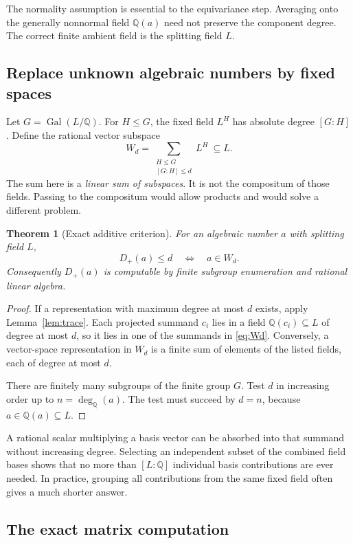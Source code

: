 \documentclass[11pt,a4paper]{article}
\newtheorem{theorem}{Theorem}[section]
\theoremstyle{definition}\newtheorem{definition}[theorem]{Definition}
\theoremstyle{remark}\newtheorem{remark}[theorem]{Remark}
\newcommand{\Q}{\mathbb Q}
\newcommand{\Gal}{\operatorname{Gal}}
\newcommand{\dega}{\operatorname{deg}_{\Q}}
\newcommand{\Dplus}{D_{+}}
\begin{document}
The normality assumption is essential to the equivariance step. Averaging
onto the generally nonnormal field $\Q(a)$ need not preserve the component
degree. The correct finite ambient field is the splitting field $L$.

\subsection{Replace unknown algebraic numbers by fixed spaces}

Let $G=\Gal(L/\Q)$. For $H\le G$, the fixed field $L^H$ has absolute
degree $[G:H]$. Define the rational vector subspace
\begin{equation}
 W_d=\sum_{\substack{H\le G\\{}[G:H]\le d}} L^H\ \subseteq L.
 \label{eq:Wd}
\end{equation}
The sum here is a \emph{linear sum of subspaces}. It is not the compositum
of those fields. Passing to the compositum would allow products and would
solve a different problem.

\begin{theorem}[Exact additive criterion]\label{thm:sum}
For an algebraic number $a$ with splitting field $L$,
\[
 \Dplus(a)\le d\quad\Longleftrightarrow\quad a\in W_d.
\]
Consequently $\Dplus(a)$ is computable by finite subgroup enumeration and
rational linear algebra.
\end{theorem}
\begin{proof}
If a representation with maximum degree at most $d$ exists, apply
Lemma~\ref{lem:trace}. Each projected summand $c_i$ lies in a field
$\Q(c_i)\subseteq L$ of degree at most $d$, so it lies in one of the
summands in \eqref{eq:Wd}. Conversely, a vector-space representation in
$W_d$ is a finite sum of elements of the listed fields, each of degree at
most $d$.

There are finitely many subgroups of the finite group $G$. Test $d$ in
increasing order up to $n=\dega(a)$. The test must succeed by $d=n$,
because $a\in\Q(a)\subseteq L$.
\end{proof}

A rational scalar multiplying a basis vector can be absorbed into that
summand without increasing degree. Selecting an independent subset of the
combined field bases shows that no more than $[L:\Q]$ individual basis
contributions are ever needed. In practice, grouping all contributions from
the same fixed field often gives a much shorter answer.

\subsection{The exact matrix computation}
\end{document}
